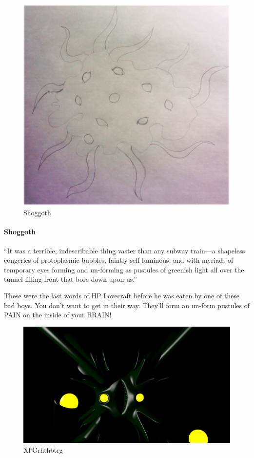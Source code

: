 \documentclass{article}
\begin{document}
\begin{figure}[h!]
\includegraphics[width=5in]{Graphics/Shoggoth.png}
\caption{Shoggoth}
\label{ShoggothPic}
\end{figure}

\paragraph{Shoggoth}
“It was a terrible, indescribable thing vaster than any subway train—a shapeless congeries of protoplasmic bubbles, faintly self-luminous, and with myriads of temporary eyes forming and un-forming as pustules of greenish light all over the tunnel-filling front that bore down upon us.”

These were the last words of HP Lovecraft before he was eaten by one of these bad boys.  You don’t want to get in their way.  They’ll form an un-form pustules of PAIN on the inside of your BRAIN!

\begin{figure}[h!]
\includegraphics[width=5in]{Graphics/Xlgrhthbtrg_black.png}
\caption{Xl'Grhthbtrg}
\label{XlPic}
\end{figure}
\end{document}
